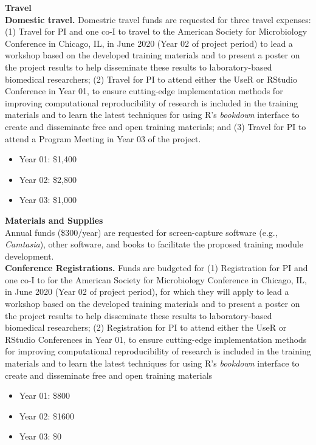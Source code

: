 \documentclass[pdftex,english,11pt,parskip=half]{scrartcl}
\begin{document}
{\large \textbf{Travel}} \\

\noindent \textbf{Domestic travel.} Domestric travel funds are requested for three travel expenses: (1) Travel for PI and one co-I to travel to the American Society for Microbiology Conference in Chicago, IL, in June 2020 (Year 02 of project period) to lead a workshop based on the developed training materials and to present a poster on the project results to help disseminate these results to laboratory-based biomedical researchers; (2) Travel for PI to attend either the UseR or RStudio Conference in Year 01, to ensure cutting-edge implementation methods for improving computational reproducibility of research is included in the training materials and to learn the latest techniques for using R's \textit{bookdown} interface to create and disseminate free and open training materials; and (3) Travel for PI to attend a Program Meeting in Year 03 of the project. 
\begin{itemize}
\item Year 01: \$1,400
\item Year 02: \$2,800
\item Year 03: \$1,000
\end{itemize}

{\large \textbf{Materials and Supplies}} \\ Annual funds (\$300/year) are requested for screen-capture software (e.g., \textit{Camtasia}), other software, and books to facilitate the proposed training module development. \\

\noindent \textbf{Conference Registrations.} Funds are budgeted for (1) Registration for PI and one co-I to for the American Society for Microbiology Conference in Chicago, IL, in June 2020 (Year 02 of project period), for which they will apply to lead a workshop based on the developed training materials and to present a poster on the project results to help disseminate these results to laboratory-based biomedical researchers; (2) Registration for PI to attend either the UseR or RStudio Conferences in Year 01, to ensure cutting-edge implementation methods for improving computational reproducibility of research is included in the training materials and to learn the latest techniques for using R's \textit{bookdown} interface to create and disseminate free and open training materials
\begin{itemize}
\item Year 01: \$800
\item Year 02: \$1600
\item Year 03: \$0
\end{itemize}
\end{document}
